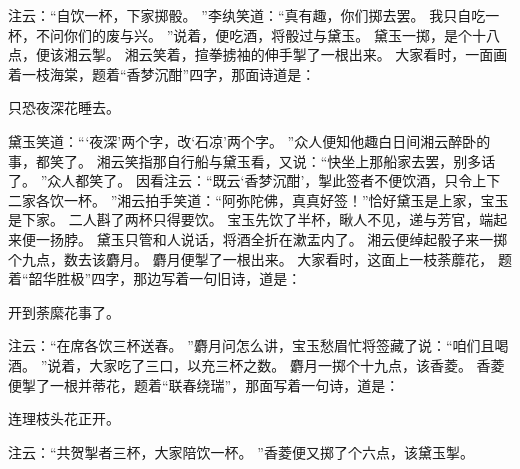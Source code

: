 \par
\hop
注云：“自饮一杯，下家掷骰。
”李纨笑道：“真有趣，你们掷去罢。
我只自吃一杯，不问你们的废与兴。
”说着，便吃酒，将骰过与黛玉。
黛玉一掷，是个十八点，便该湘云掣。
湘云笑着，揎拳掳袖的伸手掣了一根出来。
大家看时，一面画着一枝海棠，题着“香梦沉酣”四字，那面诗道是：\par
\hop
只恐夜深花睡去。
\par
{}
\par
\hop
黛玉笑道：“‘夜深’两个字，改‘石凉’两个字。
”众人便知他趣白日间湘云醉卧的事，都笑了。
湘云笑指那自行船与黛玉看，又说：“快坐上那船家去罢，别多话了。
”众人都笑了。
因看注云：“既云‘香梦沉酣’，掣此签者不便饮酒，只令上下二家各饮一杯。
”湘云拍手笑道：“阿弥陀佛，真真好签！”恰好黛玉是上家，宝玉是下家。
二人斟了两杯只得要饮。
宝玉先饮了半杯，瞅人不见，递与芳官，端起来便一扬脖。
黛玉只管和人说话，将酒全折在漱盂内了。
湘云便绰起骰子来一掷个九点，数去该麝月。
麝月便掣了一根出来。
大家看时，这面上一枝荼蘼花，
题着“韶华胜极”四字，那边写着一句旧诗，道是：\par
\hop
开到荼縻花事了。
\par
{}
\par
\hop
注云：“在席各饮三杯送春。
”麝月问怎么讲，宝玉愁眉忙将签藏了说：“咱们且喝酒。
”说着，大家吃了三口，以充三杯之数。
麝月一掷个十九点，该香菱。
香菱便掣了一根并蒂花，题着“联春绕瑞”，那面写着一句诗，道是：\par
\hop
连理枝头花正开。
\par
{}
\par
\hop
注云：“共贺掣者三杯，大家陪饮一杯。
”香菱便又掷了个六点，该黛玉掣。
